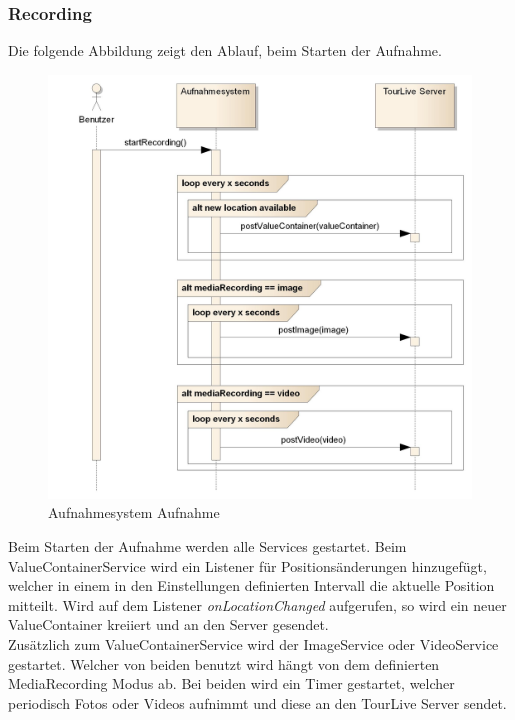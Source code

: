 \subsubsection{Recording}
Die folgende Abbildung zeigt den Ablauf, beim Starten der Aufnahme.
\begin{figure}[H]
	\centering
	\includegraphics[width=150mm]{images/android/recording.jpg}
	\caption{Aufnahmesystem Aufnahme}
\end{figure}

Beim Starten der Aufnahme werden alle Services gestartet. Beim ValueContainerService wird ein Listener für Positionsänderungen hinzugefügt, welcher in einem in den Einstellungen definierten Intervall die aktuelle Position mitteilt. Wird auf dem Listener \textit{onLocationChanged} aufgerufen, so wird ein neuer ValueContainer kreiiert und an den Server gesendet.\\
Zusätzlich zum ValueContainerService wird der ImageService oder VideoService gestartet. Welcher von beiden benutzt wird hängt von dem definierten MediaRecording Modus ab. Bei beiden wird ein Timer gestartet, welcher periodisch Fotos oder Videos aufnimmt und diese an den TourLive Server sendet.